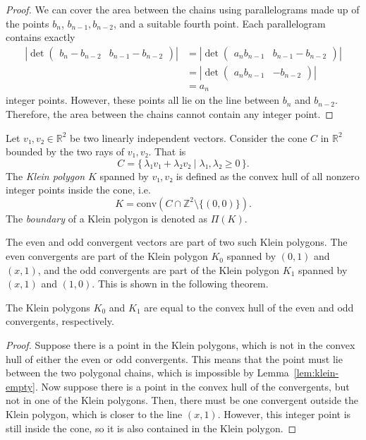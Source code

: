 \begin{proof}
  We can cover the area between the chains
  using parallelograms made up of the points $b_n$, $b_{n-1}, b_{n-2}$, and a suitable fourth point.
  Each parallelogram contains exactly
  \begin{align*}
    \left|\det\begin{pmatrix}
      b_n - b_{n-2} & b_{n-1} - b_{n-2}
    \end{pmatrix}\right|
    & = \left|\det\begin{pmatrix}
      a_n b_{n-1} & b_{n-1} - b_{n-2}
    \end{pmatrix}\right| \\
    & = \left|\det\begin{pmatrix}
      a_n b_{n-1} & -b_{n-2}
    \end{pmatrix}\right| \\
    & = a_n
  \end{align*}
  integer points.
  However, these points all lie on the line between $b_n$ and $b_{n-2}$.
  Therefore, the area between the chains cannot contain any integer point.
\end{proof}

\begin{definition}
  \label{def:klein-polygon}
  Let $v₁, v₂ ∈ ℝ^2$ be two linearly independent vectors.
  Consider the cone $C$ in $ℝ^2$ bounded by the two rays of $v₁, v₂$. That is
  \[
    C = \{\, λ₁ v₁ + λ₂ v₂ \mid λ₁, λ₂ ≥ 0 \,\}.
  \]
  The \emph{Klein polygon} $K$ spanned by $v₁, v₂$ is defined as the convex hull
  of all nonzero integer points inside the cone, i.e.
  \[
    K = \mathrm{conv}(C ∩ ℤ^2 \setminus \{(0, 0)\}).
  \]
  The \emph{boundary} of a Klein polygon is denoted as $Π(K)$.
\end{definition}

The even and odd convergent vectors are part of two such Klein polygons.
The even convergents are part of the Klein polygon $K_0$ spanned by $(0, 1)$ and $(x, 1)$,
and the odd convergents are part of the Klein polygon $K_1$ spanned by $(x, 1)$ and $(1, 0)$.
This is shown in the following theorem.

\begin{theorem}
  The Klein polygons $K_0$ and $K_1$ are equal to the
  convex hull of the even and odd convergents, respectively.
\end{theorem}

\begin{proof}
  Suppose there is a point in the Klein polygons,
  which is not in the convex hull of either the even or odd convergents.
  This means that the point must lie between the two polygonal chains,
  which is impossible by Lemma~\ref{lem:klein-empty}.
  Now suppose there is a point in the convex hull of the convergents,
  but not in one of the Klein polygons.
  Then, there must be one convergent outside the Klein polygon,
  which is closer to the line $(x, 1)$.
  However, this integer point is still inside the cone,
  so it is also contained in the Klein polygon.
\end{proof}

